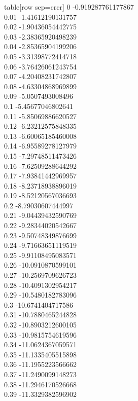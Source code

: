   table[row sep=crcr]{%
0	-0.919287761177867\\
0.01	-1.41612190131757\\
0.02	-1.90436054442775\\
0.03	-2.38365920498239\\
0.04	-2.85365904199206\\
0.05	-3.31398772414718\\
0.06	-3.76426061243754\\
0.07	-4.20408231742807\\
0.08	-4.63304868969899\\
0.09	-5.0507493008496\\
0.1	-5.45677046802641\\
0.11	-5.85069886620527\\
0.12	-6.23212575848335\\
0.13	-6.60065185460008\\
0.14	-6.95589278127979\\
0.15	-7.29748511473426\\
0.16	-7.62509288644292\\
0.17	-7.93841442969957\\
0.18	-8.23718938896019\\
0.19	-8.52120567036693\\
0.2	-8.79030607444997\\
0.21	-9.04439432590769\\
0.22	-9.28344020542667\\
0.23	-9.50748349876699\\
0.24	-9.71663651119519\\
0.25	-9.91108495083571\\
0.26	-10.0910870599101\\
0.27	-10.2569709626723\\
0.28	-10.4091302954217\\
0.29	-10.5480182783096\\
0.3	-10.6741404717586\\
0.31	-10.7880465244828\\
0.32	-10.8903212600105\\
0.33	-10.9815754619596\\
0.34	-11.0624367059571\\
0.35	-11.1335405515898\\
0.36	-11.1955223566662\\
0.37	-11.2490099148273\\
0.38	-11.2946170526668\\
0.39	-11.3329382596902\\
}
